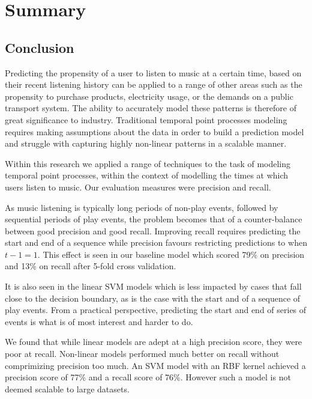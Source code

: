 
\chapter{Summary} %

\label{Chapter6} 

\section{Conclusion}

Predicting the propensity of a user to listen to music at a certain time, based on their recent listening history can be applied to a range of other areas such as the propensity to purchase products, electricity usage, or the demands on a public transport system. The ability to accurately model these patterns is therefore of great significance to industry. Traditional temporal point processes modeling requires making assumptions about the data in order to build a prediction model and struggle with capturing highly non-linear patterns in a scalable manner. 

Within this research we applied a range of techniques to the task of modeling temporal point processes, within the context of modelling the times at which users listen to music. Our evaluation measures were precision and recall. 

As music listening is typically long periods of non-play events, followed by sequential periods of play events, the problem becomes that of a counter-balance between good precision and good recall. Improving recall requires predicting the start and end of a sequence while precision favours restricting predictions to when $t-1 = 1$. This effect is seen in our baseline model which scored 79\% on precision and 13\% on recall after 5-fold cross validation.

It is also seen in the linear SVM models which is less impacted by cases that fall close to the decision boundary, as is the case with the start and of a sequence of play events. From a practical perspective, predicting the start and end of series of events is what is of most interest and harder to do. 

We found that while linear models are adept at a high precision score, they were poor at recall. Non-linear models performed much better on recall without comprimizing precision too much. An SVM model with an RBF kernel achieved a precision score of 77\% and a recall score of 76\%. However such a model is not deemed scalable to large datasets.

